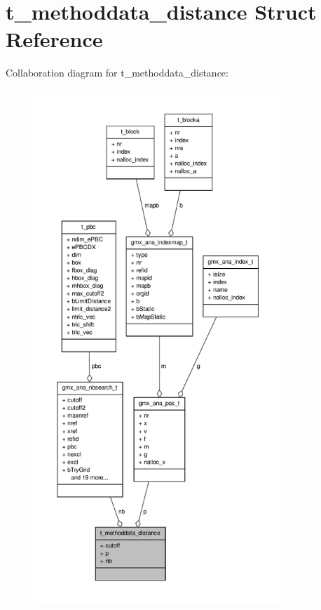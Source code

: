 \hypertarget{structt__methoddata__distance}{\section{t\-\_\-methoddata\-\_\-distance \-Struct \-Reference}
\label{structt__methoddata__distance}
}


\-Collaboration diagram for t\-\_\-methoddata\-\_\-distance\-:
\nopagebreak
\begin{figure}[H]
\begin{center}
\leavevmode
\includegraphics[height=550pt]{structt__methoddata__distance__coll__graph}
\end{center}
\end{figure}
